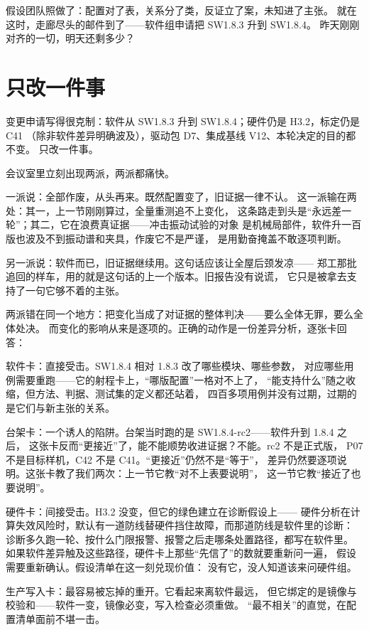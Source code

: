 假设团队照做了：配置对了表，关系分了类，反证立了案，未知进了主张。
就在这时，走廊尽头的邮件到了——软件组申请把 SW1.8.3 升到 SW1.8.4。
昨天刚刚对齐的一切，明天还剩多少？

\section{只改一件事}

变更申请写得很克制：软件从 SW1.8.3 升到 SW1.8.4；硬件仍是 H3.2，标定仍是 C41
（除非软件差异明确波及），驱动包 D7、集成基线 V12、本轮决定的目的都不变。
只改一件事。

会议室里立刻出现两派，两派都痛快。

一派说：全部作废，从头再来。既然配置变了，旧证据一律不认。
这一派输在两处：其一，上一节刚刚算过，全量重测追不上变化，
这条路走到头是“永远差一轮”；其二，它在浪费真证据——冲击振动试验的对象
是机械局部件，软件升一百版也波及不到振动谱和夹具，作废它不是严谨，
是用勤奋掩盖不敢逐项判断。

另一派说：软件而已，旧证据继续用。这句话应该让全屋后颈发凉——
郑工那批追回的样车，用的就是这句话的上一个版本。旧报告没有说谎，
它只是被拿去支持了一句它够不着的主张。

两派错在同一个地方：把变化当成了对证据的整体判决——要么全体无罪，要么全体处决。
而变化的影响从来是逐项的。正确的动作是一份差异分析，逐张卡回答：

软件卡：直接受击。SW1.8.4 相对 1.8.3 改了哪些模块、哪些参数，
对应哪些用例需要重跑——它的射程卡上，“哪版配置”一格对不上了，
“能支持什么”随之收缩，但方法、判据、测试集的定义都还站着，
四百多项用例并没有过期，过期的是它们与新主张的关系。

台架卡：一个诱人的陷阱。台架当时跑的是 SW1.8.4-rc2——软件升到 1.8.4 之后，
这张卡反而“更接近”了，能不能顺势收进证据？不能。rc2 不是正式版，
P07 不是目标样机，C42 不是 C41。“更接近”仍然不是“等于”，
差异仍然要逐项说明。这张卡教了我们两次：上一节它教“对不上表要说明”，
这一节它教“接近了也要说明”。

硬件卡：间接受击。H3.2 没变，但它的绿色建立在诊断假设上——
硬件分析在计算失效风险时，默认有一道防线替硬件挡住故障，而那道防线是软件里的诊断：
诊断多久跑一轮、按什么门限报警、报警之后走哪条处置路径，都写在软件里。
如果软件差异触及这些路径，硬件卡上那些“先信了”的数就要重新问一遍，
假设需要重新确认。假设清单在这一刻兑现价值：
没有它，没人知道该来问硬件组。

生产写入卡：最容易被忘掉的重开。它看起来离软件最远，
但它绑定的是镜像与校验和——软件一变，镜像必变，写入检查必须重做。
“最不相关”的直觉，在配置清单面前不堪一击。

